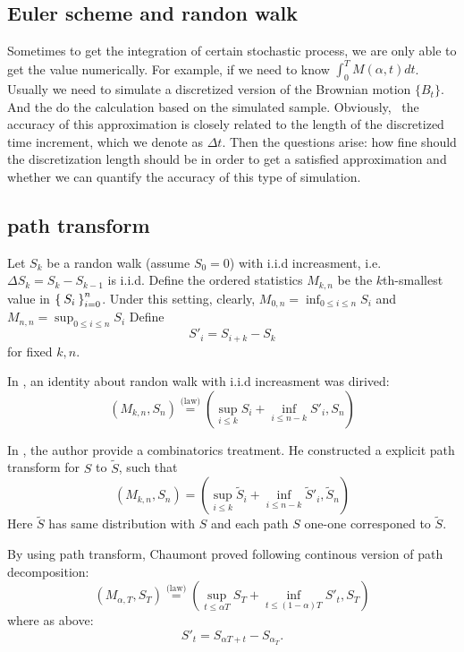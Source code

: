 \documentclass[11pt]{book}
\def\eqlaw{{\stackrel{\text{(law)}}{=}}}
\def\tS{{\widetilde{S}}}
\begin{document}
\subsection{Euler scheme and randon walk}
Sometimes to get the integration of certain stochastic process, we are only able to get the value numerically. For example, if we need to know $\int^T_{0} M(\alpha , t)dt$. Usually we need to simulate a discretized version of the Brownian motion $\{B_t\}$. And the do the calculation based on the simulated sample. Obviously,  the accuracy of this approximation is closely related to the length of the discretized time increment, which we denote as $\Delta t$. Then the questions arise: how fine should the discretization length should be in order to get a satisfied approximation and whether we can quantify the accuracy of this type of simulation. 





\subsection{path transform}
Let $S_k$ be a randon walk (assume $S_0=0$)
with i.i.d increasment, i.e.
$\Delta S_k = S_k -  S_{k-1}$ is i.i.d.
Define the ordered statistics $M_{k,n}$ be the $k$th-smallest value in
$\Set{S_i}_{i=0}^n$.
Under this setting, clearly, $M_{0,n} = \inf_{0\leq i\leq n}S_i$
and $M_{n,n} = \sup_{0\leq i\leq n}S_i$
Define
\[S'_i = S_{i+k}-S_k\]
for fixed $k, n$.

In \cite{Wendel1960}, an identity about randon walk with
i.i.d increasment was dirived:
\begin{equation}\label{eq:dpathdec}
(M_{k,n}, S_n) \eqlaw (\sup_{i\leq k} S_i +\inf_{i\leq n-k} S'_i, S_n)
\end{equation}

In \cite{Chaumont1999}, the author provide a combinatorics treatment.
He constructed a explicit path transform for $S$ to $\tS$, such that
\[
(M_{k,n}, S_n) = (\sup_{i\leq k} \tS_i+\inf_{i\leq n-k} \tS'_i, \tS_n)
\]
Here $\tS$ has same distribution with $S$ and each path $S$
 one-one corresponed to $\tS$.

By using path transform, Chaumont proved
following continous version of path decomposition:
\begin{equation}\label{eq:cpathdec}
(M_{\alpha,T}, S_T) \eqlaw (\sup_{t\leq \alpha{T}} S_T +\inf_{t \leq (1-\alpha)T} S'_t, S_T)
\end{equation}
where as above:
\[
S'_t = S_{\alpha T+t} - S_{\alpha_T}.
\]
\end{document}
